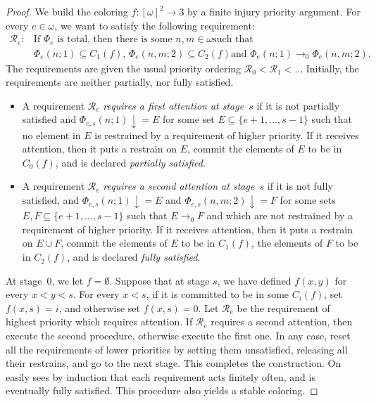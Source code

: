 \documentclass{amsart}
\theoremstyle{definition}
\theoremstyle{remark}
\numberwithin{equation}{section}
\theoremstyle{noparens}
\newcommand{\Rcal}{\mathcal{R}}
\begin{document}
\begin{proof}
We build the coloring $f : [\omega]^2 \to 3$ by a finite injury priority argument.
For every $e \in \omega$, we want to satisfy the following requirement:
\begin{align}
\Rcal_e: &\text{If $\Phi_e$ is total, then there is some $n, m \in \omega$
such that}\\ \nonumber
&\text{$\Phi_e(n;1) \subseteq C_1(f)$, $\Phi_e(n,m;2) \subseteq C_2(f)$
and $\Phi_e(n;1) \to_0 \Phi_e(n,m;2)$.}
\end{align}
The requirements are given the usual priority ordering $\Rcal_0 < \Rcal_1 < \dots$
Initially, the requirements are neither partially, nor fully satisfied.
\begin{itemize}
	\item[(i)] A requirement $\Rcal_e$ \emph{requires a first attention at stage~$s$}
	if it is not partially satisfied and $\Phi_{e,s}(n;1) \downarrow = E$ for some set $E \subseteq \{e+1, \dots, s-1\}$
	such that no element in $E$ is restrained by a requirement of higher priority.
	If it receives attention, then it puts a restrain on $E$,
	commit the elements of $E$ to be in $C_0(f)$, and is declared \emph{partially satisfied}.

	\item[(ii)] A requirement $\Rcal_e$ \emph{requires a second attention at stage~$s$}
	if it is not fully satisfied, and $\Phi_{e,s}(n;1) \downarrow = E$ and $\Phi_{e,s}(n,m;2) \downarrow = F$
	for some sets $E, F \subseteq \{e+1, \dots, s-1\}$ such that $E \to_0 F$ and which are not restrained
	by a requirement of higher priority. If it receives attention,
	then it puts a restrain on $E \cup F$, commit the elements of $E$ to be in $C_1(f)$,
	the elements of $F$ to be in $C_2(f)$, and is declared \emph{fully satisfied}.
\end{itemize}
At stage~0, we let $f = \emptyset$.
Suppose that at stage $s$, we have defined $f(x, y)$ for every $x < y < s$.
For every $x < s$, if it is committed to be in some $C_i(f)$, set $f(x, s) = i$,
and otherwise set $f(x, s) = 0$.
Let $\Rcal_e$ be the requirement of highest priority which requires attention.
If $\Rcal_e$ requires a second attention,
then execute the second procedure, otherwise execute the first one.
In any case, reset all the requirements of lower priorities by setting them unsatisfied,
releasing all their restrains, and go to the next stage.
This completes the construction.
On easily sees by induction that each requirement acts finitely often, and is eventually
fully satisfied. This procedure also yields a stable coloring.
\end{proof}
\end{document}
